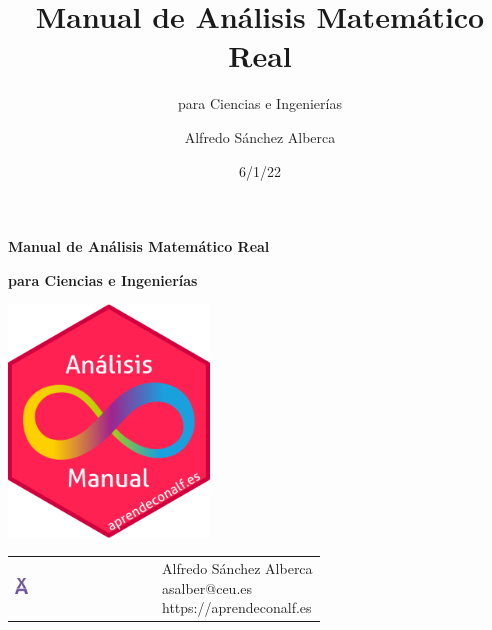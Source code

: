 \documentclass[
  a4paper,
]{scrreport}
\title{Manual de Análisis Matemático Real}
\subtitle{para Ciencias e Ingenierías}
\author{Alfredo Sánchez Alberca}
\date{6/1/22}
\theoremstyle{plain}
\theoremstyle{plain}
\theoremstyle{definition}
\theoremstyle{plain}
\theoremstyle{definition}
\theoremstyle{remark}
\begin{document}
\begin{titlepage}

\begin{center}
\vspace*{5cm}

\Huge
{\textbf{\textsf{Manual de Análisis Matemático Real}}}

\vspace{0.5cm}
\LARGE
{\textbf{\textsf{para Ciencias e Ingenierías}}}

\vspace{1.5cm}

\includegraphics[width=0.4\textwidth]{img/logos/sticker.png}
\end{center}

\vfill

\begin{flushleft}
\begin{tabular}{ll}
\includegraphics[width=0.1\textwidth]{img/logos/aprendeconalf.png} & \parbox[b]{5cm}{\Large\textsf{Alfredo
Sánchez
Alberca}\\ \textsf{asalber@ceu.es} \\ \textsf{https://aprendeconalf.es}}
\end{tabular}
\end{flushleft}
\end{titlepage}\ifdefined\Shaded\renewenvironment{Shaded}{\begin{tcolorbox}[frame hidden, borderline west={3pt}{0pt}{shadecolor}, interior hidden, sharp corners, boxrule=0pt, enhanced, breakable]}{\end{tcolorbox}}\fi
\end{document}
